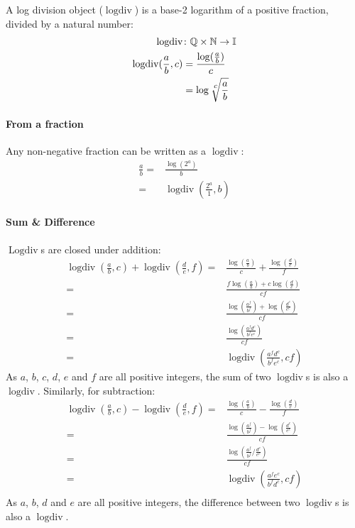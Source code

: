\documentclass{article}
\DeclareMathOperator{\logdiv}{logdiv}
\DeclareMathOperator{\Logdiv}{Logdiv}
\begin{document}
            A log division object ($\logdiv$) is a base-2 logarithm of a positive fraction, divided by a natural number:
            \begin{align*}
                \logdiv &{}\colon \mathbb{Q} \times \mathbb{N} \rightarrow \mathbb{I}\\
                \logdiv(\frac{a}{b}, c) &{}= \frac{\log(\frac{a}{b})}{c}\\
                &{}= \log \sqrt[\leftroot{-1}\uproot{2}\scriptstyle c]{\frac{a}{b}}
            \end{align*}

            \paragraph{From a fraction}
                Any non-negative fraction can be written as a $\logdiv$:
                \begin{align*}
                    \frac{a}{b} ={}& \frac{\log(2^a)}{b} \\
                    {}={}& \logdiv(\frac{2^a}{1}, b)
                \end{align*}
    
            \paragraph{Sum \& Difference}
                $\Logdiv$s are closed under addition:
                \begin{align*}
                    \logdiv(\frac{a}{b}, c) + \logdiv(\frac{d}{e}, f) = {}& 
                    \frac{\log(\frac{a}{b})}{c} + \frac{\log(\frac{d}{e})}{f}\\
                    {}={}& \frac{f\log(\frac{a}{b}) + c\log(\frac{d}{e})}{cf}\\
                    {}={}& \frac{\log(\frac{a^f}{b^f}) + \log(\frac{d^c}{e^c})}{cf}\\
                    {}={}& \frac{\log(\frac{a^f d^c}{b^f e^c})}{cf}\\
                    {}={}& \logdiv(\frac{a^f d^c}{b^f e^c}, cf)
                \end{align*}
                As $a$, $b$, $c$, $d$, $e$ and $f$ are all positive integers, the sum of two $\logdiv$s is also a $\logdiv$.
                Similarly, for subtraction:
                \begin{align*}
                    \logdiv(\frac{a}{b}, c) - \logdiv(\frac{d}{e}, f) = {}& 
                    \frac{\log(\frac{a}{b})}{c} - \frac{\log(\frac{d}{e})}{f}\\
                    {}={}& \frac{\log(\frac{a^f}{b^f}) - \log(\frac{d^c}{e^c})}{cf}\\
                    {}={}& \frac{\log(\frac{a^f}{b^f} / \frac{d^c}{e^c})}{cf}\\
                    {}={}& \logdiv(\frac{a^f e^c}{b^f d^c}, cf)\\
                \end{align*}
                As $a$, $b$, $d$ and $e$ are all positive integers, the difference between two $\logdiv$s is also a $\logdiv$.
\end{document}
